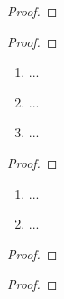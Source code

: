 \documentclass[12pt]{scrreprt}
\begin{document}
\begin{thm}\label{}

\end{thm}
\begin{proof}

\end{proof}

\begin{satz}\label{}

\end{satz}
\begin{proof}

\end{proof}

\begin{dfn}\label{}

\end{dfn}

\begin{bem}\label{}
\begin{enumerate}
\item ...
\item ...
\item ...
\end{enumerate}
\end{bem}

\begin{kor}\label{}

\end{kor}
\begin{proof}

\end{proof}

\begin{satz}\label{}
\begin{enumerate}
\item ...
\item ...
\end{enumerate}
\end{satz}
\begin{bem*}

\end{bem*}
\begin{proof}

\end{proof}

\begin{bsp}\label{}

\end{bsp}
\begin{proof}

\end{proof}
\end{document}
